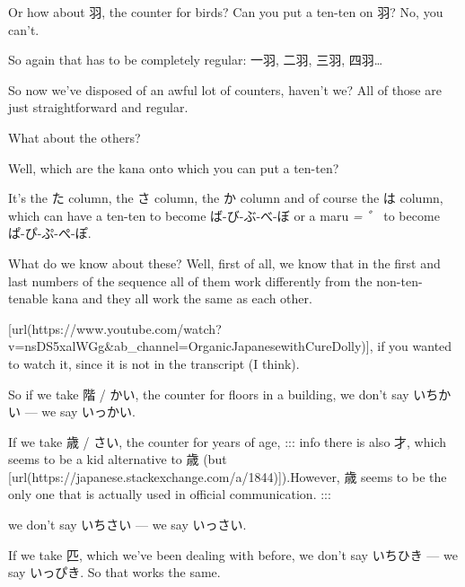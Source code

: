 Or how about 羽, the counter for birds? Can you put a ten-ten on 羽? No, you can't.

So again that has to be completely regular: 一羽, 二羽, 三羽, 四羽\ldots{}

So now we've disposed of an awful lot of counters, haven't we? All of those are just straightforward and regular.

What about the others?

\stopsectionlevel

\stopsectionlevel

\startsectionlevel[title={Kana rows with sound changes - た, さ, か, は},reference={kana-rows-with-sound-changes---た-さ-か-は}]

Well, which are the kana onto which you can put a ten-ten?

{}

It's the た column, the さ column, the か column and of course the は column, which can have a ten-ten to become ば-び-ぶ-べ-ぼ or a maru {\em = ゜} to become ぱ-ぴ-ぷ-ぺ-ぽ.

\startsectionlevel[title={Rule 2},reference={rule-2}]

What do we know about these? Well, first of all, we know that in the first and last numbers of the sequence all of them work differently from the non-ten-tenable kana and they all work the same as each other.

{}

{}

[url(https://www.youtube.com/watch?v=nsDS5xalWGg&ab_channel=OrganicJapanesewithCureDolly)], if you wanted to watch it, since it is not in the transcript (I think).

So if we take 階 / かい, the counter for floors in a building, we don't say いちかい --- we say いっかい.

If we take 歳 / さい, the counter for years of age, ::: info there is also 才, which seems to be a kid alternative to 歳 (but [url(https://japanese.stackexchange.com/a/1844)]).{\bf }However, 歳 seems to be the only one that is actually used in official communication. :::

we don't say いちさい --- we say いっさい.

If we take 匹, which we've been dealing with before, we don't say いちひき --- we say いっぴき. So that works the same.

